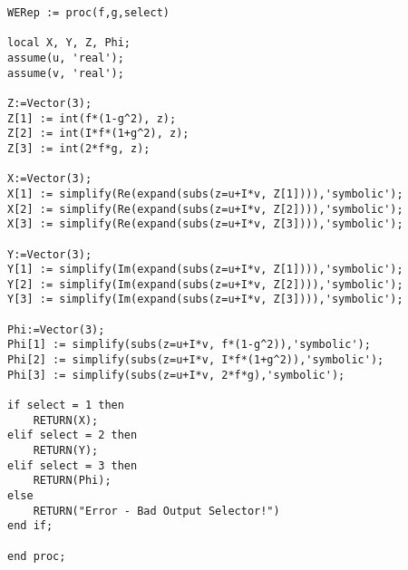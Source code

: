\begin{verbatim}
WERep := proc(f,g,select)
    
local X, Y, Z, Phi;
assume(u, 'real');
assume(v, 'real');

Z:=Vector(3); 
Z[1] := int(f*(1-g^2), z);
Z[2] := int(I*f*(1+g^2), z);
Z[3] := int(2*f*g, z);

X:=Vector(3);
X[1] := simplify(Re(expand(subs(z=u+I*v, Z[1]))),'symbolic');
X[2] := simplify(Re(expand(subs(z=u+I*v, Z[2]))),'symbolic');
X[3] := simplify(Re(expand(subs(z=u+I*v, Z[3]))),'symbolic');

Y:=Vector(3);
Y[1] := simplify(Im(expand(subs(z=u+I*v, Z[1]))),'symbolic');
Y[2] := simplify(Im(expand(subs(z=u+I*v, Z[2]))),'symbolic');
Y[3] := simplify(Im(expand(subs(z=u+I*v, Z[3]))),'symbolic');

Phi:=Vector(3);
Phi[1] := simplify(subs(z=u+I*v, f*(1-g^2)),'symbolic');
Phi[2] := simplify(subs(z=u+I*v, I*f*(1+g^2)),'symbolic');
Phi[3] := simplify(subs(z=u+I*v, 2*f*g),'symbolic');

if select = 1 then
	RETURN(X);
elif select = 2 then
	RETURN(Y);
elif select = 3 then
	RETURN(Phi);
else
	RETURN("Error - Bad Output Selector!")
end if;

end proc;
\end{verbatim}
